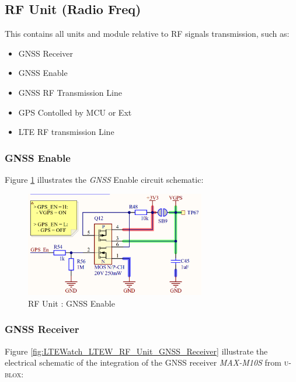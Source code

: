 \documentclass[report.tex]{subfiles}
\begin{document}

\subsection{RF Unit (Radio Freq)}
This contains all units and module relative to RF signals transmission, such as:
\begin{itemize}
\item GNSS Receiver
\item GNSS Enable
\item GNSS RF Transmission Line
\item GPS Contolled by MCU or Ext 
\item LTE RF transmission Line
\end{itemize}

\subsubsection{GNSS Enable}

Figure \ref{fig:LTEWatch_LTEW_RF_Unit_GPS_Enable} illustrates the \textit{GNSS} Enable circuit schematic:

\begin{figure}[H]
	\centering
	\includegraphics[width=0.7\textwidth]{Include/Figure/Hardware/LTEWatch_LTEW_RF_Unit_GPS_Enable}
	\caption{RF Unit : GNSS Enable}
	\label{fig:LTEWatch_LTEW_RF_Unit_GPS_Enable}
\end{figure}


\subsubsection{GNSS Receiver}

Figure \ref{fig:LTEWatch_LTEW_RF_Unit_GNSS_Receiver} illustrate the electrical schematic of the integration of the GNSS receiver \textit{MAX-M10S} from \textsc{u-blox}:
\end{document}
